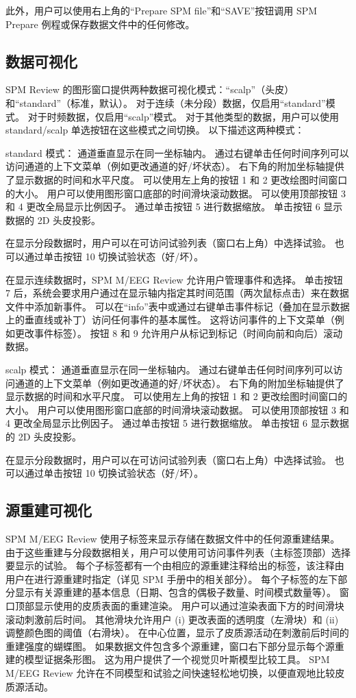 此外，用户可以使用右上角的“Prepare SPM file”和“SAVE”按钮调用 SPM Prepare 例程或保存数据文件中的任何修改。


\subsection{数据可视化}

SPM Review 的图形窗口提供两种数据可视化模式：“scalp”（头皮）和“standard”（标准，默认）。
对于连续（未分段）数据，仅启用“standard”模式。
对于时频数据，仅启用“scalp”模式。
对于其他类型的数据，用户可以使用 standard/scalp 单选按钮在这些模式之间切换。
以下描述这两种模式：

standard 模式：
通道垂直显示在同一坐标轴内。
通过右键单击任何时间序列可以访问通道的上下文菜单（例如更改通道的好/坏状态）。
右下角的附加坐标轴提供了显示数据的时间和水平尺度。
可以使用左上角的按钮 1 和 2 更改绘图时间窗口的大小。
用户可以使用图形窗口底部的时间滑块滚动数据。
可以使用顶部按钮 3 和 4 更改全局显示比例因子。
通过单击按钮 5 进行数据缩放。
单击按钮 6 显示数据的 2D 头皮投影。

在显示分段数据时，用户可以在可访问试验列表（窗口右上角）中选择试验。
也可以通过单击按钮 10 切换试验状态（好/坏）。

在显示连续数据时，SPM M/EEG Review 允许用户管理事件和选择。
单击按钮 7 后，系统会要求用户通过在显示轴内指定其时间范围（两次鼠标点击）来在数据文件中添加新事件。
可以在“info”表中或通过右键单击事件标记（叠加在显示数据上的垂直线或补丁）访问任何事件的基本属性。
这将访问事件的上下文菜单（例如更改事件标签）。
按钮 8 和 9 允许用户从标记到标记（时间向前和向后）滚动数据。

scalp 模式：
通道垂直显示在同一坐标轴内。
通过右键单击任何时间序列可以访问通道的上下文菜单（例如更改通道的好/坏状态）。
右下角的附加坐标轴提供了显示数据的时间和水平尺度。
可以使用左上角的按钮 1 和 2 更改绘图时间窗口的大小。
用户可以使用图形窗口底部的时间滑块滚动数据。
可以使用顶部按钮 3 和 4 更改全局显示比例因子。
通过单击按钮 5 进行数据缩放。
单击按钮 6 显示数据的 2D 头皮投影。

在显示分段数据时，用户可以在可访问试验列表（窗口右上角）中选择试验。
也可以通过单击按钮 10 切换试验状态（好/坏）。


\subsection{源重建可视化}

SPM M/EEG Review 使用子标签来显示存储在数据文件中的任何源重建结果。
由于这些重建与分段数据相关，用户可以使用可访问事件列表（主标签顶部）选择要显示的试验。
每个子标签都有一个由相应的源重建注释给出的标签，该注释由用户在进行源重建时指定（详见 SPM 手册中的相关部分）。
每个子标签的左下部分显示有关源重建的基本信息（日期、包含的偶极子数量、时间模式数量等）。
窗口顶部显示使用的皮质表面的重建渲染。
用户可以通过渲染表面下方的时间滑块滚动刺激前后时间。
其他滑块允许用户 (i) 更改表面的透明度（左滑块）和 (ii) 调整颜色图的阈值（右滑块）。
在中心位置，显示了皮质源活动在刺激前后时间的重建强度的蝴蝶图。
如果数据文件包含多个源重建，窗口右下部分显示每个源重建的模型证据条形图。
这为用户提供了一个视觉贝叶斯模型比较工具。
SPM M/EEG Review 允许在不同模型和试验之间快速轻松地切换，以便直观地比较皮质源活动。


